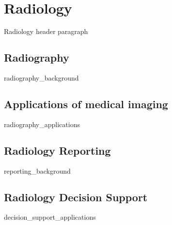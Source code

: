 \chapter{Radiology}
Radiology header paragraph

\section{Radiography}
{radiography_background}

\section{Applications of medical imaging}
{radiography_applications}

\section{Radiology Reporting}
{reporting_background}

\section{Radiology Decision Support}
{decision_support_applications}